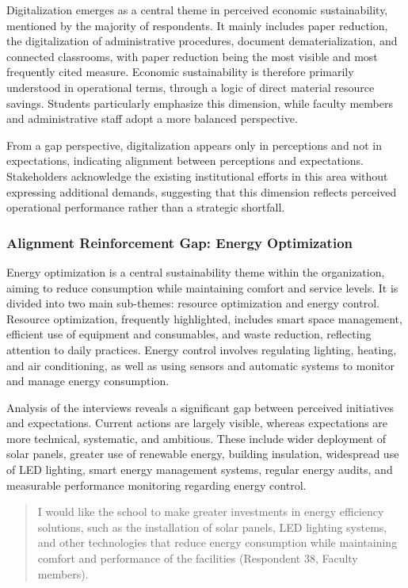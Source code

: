 \documentclass[12pt,a4paper]{article}
\begin{document}
Digitalization emerges as a central theme in perceived economic sustainability, mentioned by the majority of respondents. It mainly includes paper reduction, the digitalization of administrative procedures, document dematerialization, and connected classrooms, with paper reduction being the most visible and most frequently cited measure. Economic sustainability is therefore primarily understood in operational terms, through a logic of direct material resource savings. Students particularly emphasize this dimension, while faculty members and administrative staff adopt a more balanced perspective.

From a gap perspective, digitalization appears only in perceptions and not in expectations, indicating alignment between perceptions and expectations. Stakeholders acknowledge the existing institutional efforts in this area without expressing additional demands, suggesting that this dimension reflects perceived operational performance rather than a strategic shortfall.

\subsubsection{Alignment Reinforcement Gap: Energy Optimization}

Energy optimization is a central sustainability theme within the organization, aiming to reduce consumption while maintaining comfort and service levels. It is divided into two main sub-themes: resource optimization and energy control. Resource optimization, frequently highlighted, includes smart space management, efficient use of equipment and consumables, and waste reduction, reflecting attention to daily practices. Energy control involves regulating lighting, heating, and air conditioning, as well as using sensors and automatic systems to monitor and manage energy consumption.

Analysis of the interviews reveals a significant gap between perceived initiatives and expectations. Current actions are largely visible, whereas expectations are more technical, systematic, and ambitious. These include wider deployment of solar panels, greater use of renewable energy, building insulation, widespread use of LED lighting, smart energy management systems, regular energy audits, and measurable performance monitoring regarding energy control.

\begin{quote}
I would like the school to make greater investments in energy efficiency solutions, such as the installation of solar panels, LED lighting systems, and other technologies that reduce energy consumption while maintaining comfort and performance of the facilities (Respondent 38, Faculty members).
\end{quote}
\end{document}

